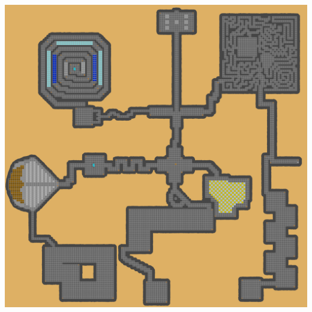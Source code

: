 \documentclass[a4paper, landscape]{article}
\begin{document}
	\begin{multicols}{2}
\includegraphics[trim = 2684 1448 1923 3034, clip, height = 19cm, width = 14cm]{Dungeon_playersmap.png}

\end{multicols}
\end{document}

